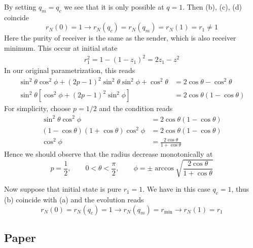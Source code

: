 \documentclass[../../../main.tex]{subfiles}
\begin{document}
By setting $q_m=q_c$ we see that it is only possible at $q=1$.
Then (b), (c), (d) coincide
\begin{equation*}
  r_N(0)=1 \longrightarrow r_N(q_c)=r_N(q_m)= r_N(1) = r_1\neq1
\end{equation*}
Here the purity of receiver is the same as the sender, which is also receiver minimum.
This occur at initial state
\begin{align*}
  r_1^2 = 1-(1-z_1)^2 = 2z_1-z^2
\end{align*}
In our original parametrization, this reads
\begin{align*}
  \sin^2\theta\cos^2\phi +(2p-1)^2\sin^2\theta\sin^2\phi +\cos^2\theta & =  2\cos\theta-\cos^2\theta  \\
  \sin^2\theta \left[ \cos^2\phi+(2p-1)^2\sin^2\phi \right]            & =  2\cos\theta(1-\cos\theta)
\end{align*}
For simplicity, choose $p=1/2$ and the condition reads
\begin{align*}
  \sin^2\theta\cos^2\phi                 & =  2\cos\theta(1-\cos\theta) \\
  (1-\cos\theta)(1+\cos\theta)\cos^2\phi & =  2\cos\theta(1-\cos\theta) \\
  \cos^2\phi                             & =
  \frac{2\cos\theta}{1+\cos\theta}
\end{align*}
Hence we should observe that the radius decrease monotonically at
\begin{equation*}
  p=\frac{1 }{2 },
  \qquad 0<\theta<\frac{\pi }{2 },
  \qquad \phi = \pm \arccos \sqrt{ \frac{2\cos\theta}{1+\cos\theta} }
\end{equation*}

Now suppose that initial state is pure $r_1=1$.
We have in this case $q_c=1$, thus (b) coincide with (a) and the evolution reads
\begin{equation*}
  r_N(0)=r_N(q_c)=1\longrightarrow
  r_N(q_m)=r_{\min}\longrightarrow
  r_N(1)=r_1
\end{equation*}


\subsection{Paper}
\end{document}
